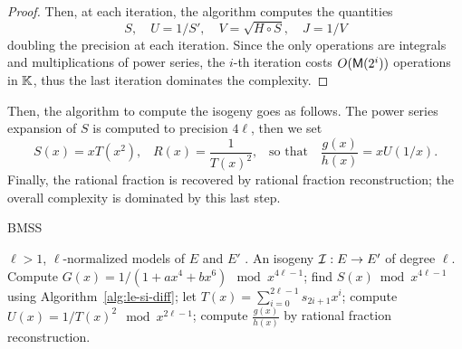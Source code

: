 \begin{proof}
  Then, at each iteration, the algorithm computes the quantities
  \begin{equation}
    \label{eq:174}
    S,\quad U = 1/S',\quad V = \sqrt{H\circ S},\quad J = 1/V
  \end{equation}
  doubling the precision at each iteration. Since the only operations
  are integrals and multiplications of power series, the $i$-th
  iteration costs $O(\mathsf{M}(2^i))$ operations in $\mathbb{K}$, thus the last
  iteration dominates the complexity.
\end{proof}


Then, the algorithm to compute the isogeny goes as follows.  The power
series expansion of $S$ is computed to precision $4\ell$, then we set
\begin{equation}
  \label{eq:180}
  S(x) = xT(x^2)
  \text{,}\quad
  R(x) = \frac{1}{T(x)^2}
  \text{,}\quad\text{so that}\quad
  \frac{g(x)}{h(x)} = xU(1/x)
  \text{.}
\end{equation}
Finally, the rational fraction is recovered by rational fraction
reconstruction; the overall complexity is dominated by this last step.

\begin{algorithm}
  \caption{BMSS}
  \begin{algorithmic}[1]
    \REQUIRE $\ell>1$, $\ell$-normalized models of $E$ and $E'$ .
    \ENSURE An isogeny $\mathcal{I}:E\rightarrow E'$ of degree $\ell$.
    \STATE Compute $G(x) = 1/(1 + ax^4 + bx^6) \mod x^{4\ell-1}$;
    \STATE find $S(x)\bmod x^{4\ell-1}$ using Algorithm~\ref{alg:le-si-diff};
    \STATE let $T(x) = \sum_{i=0}^{2\ell-1}s_{2i+1}x^i$;
    \STATE compute $U(x) = 1/T(x)^2 \mod x^{2\ell-1}$;
    \STATE compute $\frac{g(x)}{h(x)}$ by rational fraction reconstruction.
  \end{algorithmic}
\end{algorithm}

